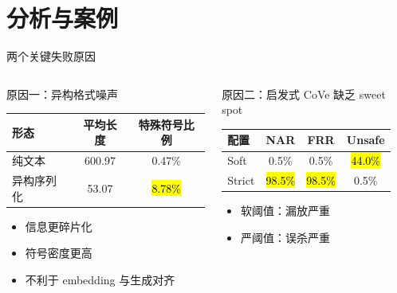\section{分析与案例}

\begin{frame}{两个关键失败原因}
  \begin{columns}[T,onlytextwidth]
    \begin{block}{原因一：异构格式噪声}
      \small
      \begin{tabular}{@{}lcc@{}}
        \toprule
        形态 & 平均长度 & 特殊符号比例 \\ \midrule
        纯文本 & 600.97 & 0.47\% \\
        异构序列化 & 53.07 & \hl{8.78\%} \\
        \bottomrule
      \end{tabular}
      \vspace{0.4em}

      \begin{itemize}
        \item 信息更碎片化
        \item 符号密度更高
        \item 不利于 embedding 与生成对齐
      \end{itemize}
    \end{block}

    \begin{alertblock}{原因二：启发式 CoVe 缺乏 sweet spot}
      \small
      \begin{tabular}{@{}lccc@{}}
        \toprule
        配置 & NAR & FRR & Unsafe \\ \midrule
        Soft   & 0.5\%  & 0.5\%  & \hl{44.0\%} \\
        Strict & \hl{98.5\%} & \hl{98.5\%} & 0.5\% \\
        \bottomrule
      \end{tabular}
      \vspace{0.4em}

      \begin{itemize}
        \item 软阈值：漏放严重
        \item 严阈值：误杀严重
      \end{itemize}
    \end{alertblock}
  \end{columns}
\end{frame}

